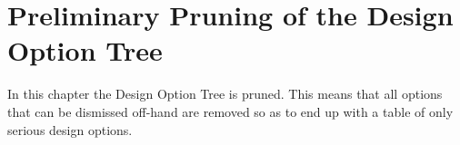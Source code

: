 \chapter{Preliminary Pruning of the Design Option Tree}
\label{prune}

In this chapter the Design Option Tree is pruned. This means that all options that can be dismissed off-hand are removed so as to end up with a table of only serious design options.